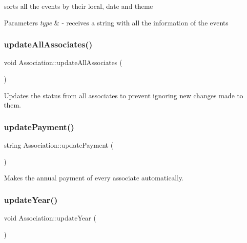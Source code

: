 sorts all the events by their local, date and theme 


\begin{DoxyParams}{Parameters}
{\em type} & -\/ receives a string with all the information of the events \\
\hline
\end{DoxyParams}
\mbox{\label{classAssociation_aafcd73622038c5174a70b1c03041810d}} 
\subsubsection{\texorpdfstring{update\+All\+Associates()}{updateAllAssociates()}}
{\footnotesize\ttfamily void Association\+::update\+All\+Associates (\begin{DoxyParamCaption}{ }\end{DoxyParamCaption})}



Updates the status from all associates to prevent ignoring new changes made to them. 

\mbox{\label{classAssociation_afd8dd744fba29817387841f4b6870c2d}} 
\subsubsection{\texorpdfstring{update\+Payment()}{updatePayment()}}
{\footnotesize\ttfamily string Association\+::update\+Payment (\begin{DoxyParamCaption}{ }\end{DoxyParamCaption})}



Makes the annual payment of every associate automatically. 

\mbox{\label{classAssociation_a8b5ea7081e95186a69ebf064ae46cda8}} 
\subsubsection{\texorpdfstring{update\+Year()}{updateYear()}}
{\footnotesize\ttfamily void Association\+::update\+Year (\begin{DoxyParamCaption}{ }\end{DoxyParamCaption})}



